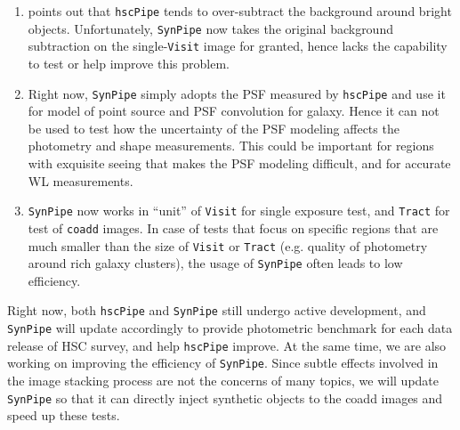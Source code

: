 \documentclass[useamsfonts]{pasj01}
\def\hscpipe{\texttt{hscPipe}}
\def\synpipe{\texttt{SynPipe}}
\def\tract{\texttt{Tract}}
\def\visit{\texttt{Visit}}
\begin{document}
    \begin{enumerate}

        \item \citet{HSCDR1} points out that \hscpipe{} tends to over-subtract the
            background around bright objects.
            Unfortunately, \synpipe{} now takes the original background subtraction on
            the single-\visit{} image for granted, hence lacks the capability to
            test or help improve this problem.

        \item Right now, \synpipe{} simply adopts the PSF measured by \hscpipe{} and
            use it for model of point source and PSF convolution for galaxy.
            Hence it can not be used to test how the uncertainty of the PSF modeling
            affects the photometry and shape measurements.
            This could be important for regions with exquisite seeing that makes the
            PSF modeling difficult, and for accurate WL measurements.

        \item \synpipe{} now works in ``unit'' of \visit{} for single exposure
            test, and \tract{} for test of \texttt{coadd} images.
            In case of tests that focus on specific regions that are much smaller than
            the size of \visit{} or \tract{} (e.g. quality of photometry
            around rich galaxy clusters), the usage of \synpipe{} often leads to
            low efficiency.

    \end{enumerate}

    Right now, both \hscpipe{} and \synpipe{} still undergo active development,
    and \synpipe{} will update accordingly to provide photometric benchmark for
    each data release of HSC survey, and help \hscpipe{} improve.
    At the same time, we are also working on improving the efficiency of \synpipe{}.
    Since subtle effects involved in the image stacking process are not the concerns
    of many topics, we will update \synpipe{} so that it can directly inject
    synthetic objects to the coadd images and speed up these tests.


\end{document}
